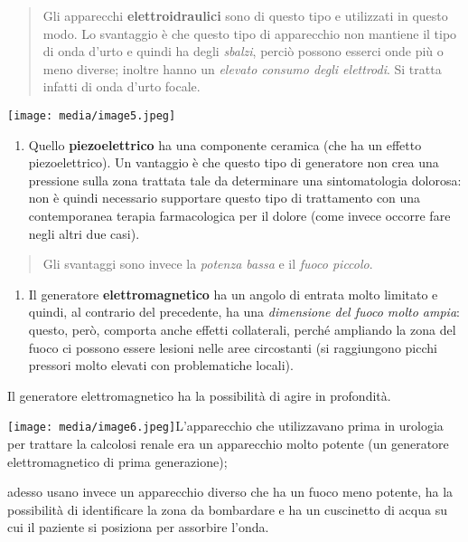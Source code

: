 \documentclass[]{article}
\begin{document}
\begin{quote}
Gli apparecchi \textbf{elettroidraulici} sono di questo tipo e
utilizzati in questo modo. Lo svantaggio è che questo tipo di
apparecchio non mantiene il tipo di onda d'urto e quindi ha degli
\emph{sbalzi}, perciò possono esserci onde più o meno diverse; inoltre
hanno un \emph{elevato consumo degli elettrodi}. Si tratta infatti di
onda d'urto focale.
\end{quote}

\texttt{[image: media/image5.jpeg]}

\begin{enumerate}
\def\labelenumi{\arabic{enumi}.}
\item
  Quello \textbf{piezoelettrico} ha una componente ceramica (che ha un
  effetto piezoelettrico). Un vantaggio è che questo tipo di generatore
  non crea una pressione sulla zona trattata tale da determinare una
  sintomatologia dolorosa: non è quindi necessario supportare questo
  tipo di trattamento con una contemporanea terapia farmacologica per il
  dolore (come invece occorre fare negli altri due casi).
\end{enumerate}

\begin{quote}
Gli svantaggi sono invece la \emph{potenza bassa} e il \emph{fuoco
piccolo}.
\end{quote}

\begin{enumerate}
\def\labelenumi{\arabic{enumi}.}
\item
  Il generatore \textbf{elettromagnetico} ha un angolo di entrata molto
  limitato e quindi, al contrario del precedente, ha una
  \emph{dimensione del fuoco molto ampia}: questo, però, comporta anche
  effetti collaterali, perché ampliando la zona del fuoco ci possono
  essere lesioni nelle aree circostanti (si raggiungono picchi pressori
  molto elevati con problematiche locali).
\end{enumerate}

Il generatore elettromagnetico ha la possibilità di agire in profondità.

\texttt{[image: media/image6.jpeg]}L'apparecchio
che utilizzavano prima in urologia per trattare la calcolosi renale era
un apparecchio molto potente (un generatore elettromagnetico di prima
generazione);

adesso usano invece un apparecchio diverso che ha un fuoco meno potente,
ha la possibilità di identificare la zona da bombardare e ha un
cuscinetto di acqua su cui il paziente si posiziona per assorbire
l'onda.
\end{document}
